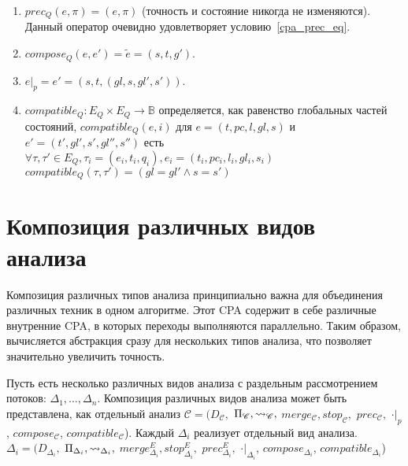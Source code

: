 \begin{enumerate}
\item
$prec_Q(e,\pi)=(e,\pi)$ (точность и состояние никогда не изменяются).
Данный оператор очевидно удовлетворяет условию~\ref{cpa_prec_eq}.

\item 
$compose_Q(e,e')=\tilde{e} = (s, t, g')$.

\item 
$e|_p = e' = (s, t, (gl, s, gl', s'))$.

\item
$compatible_Q: E_Q \times E_Q \to \mathbb{B}$ определяется, как равенство глобальных частей состояний, $compatible_Q(e,i)$ для $e=(t,pc, l, gl,s)$ и $e'=(t',gl',s',gl'',s'')$ есть    
$\forall \tau, \tau' \in E_Q, \tau_i = (e_i, t_i, q_i), e_i=(t_i,pc_i, l_i, gl_i,s_i)$ \\
$compatible_Q(\tau, \tau') = (gl=gl' \land s=s')$

\end{enumerate}

\section{Композиция различных видов анализа}
\label{sect_composite_analysis}

Композиция различных типов анализа принципиально важна для объединения различных техник в одном алгоритме.
Этот CPA содержит в себе различные внутренние CPA, в которых переходы выполняются параллельно.
Таким образом, вычисляется абстракция сразу для нескольких типов анализа, что позволяет значительно увеличить точность.

Пусть есть несколько различных видов анализа с раздельным рассмотрением потоков: $\Delta_1, \dots, \Delta_n$. 
Композиция различных видов анализа может быть представлена, как отдельный анализ $\mathscr{C}=(D_{\mathscr{C}},$ $\Pi_{\mathscr{C}}, \leadsto_{\mathscr{C}},$ $merge_{\mathscr{C}}, stop_{\mathscr{C}},$ $prec_{\mathscr{C}},$ $\cdot|_p$, $compose_{\mathscr{C}}$, $compatible_{\mathscr{C}}$).
Каждый $\Delta_i$ реализует отдельный вид анализа. 
$\Delta_i=(D_{\Delta_i},$ $\Pi_{\Delta_i}, \leadsto_{\Delta_i},$ $merge^E_{\Delta_i}, stop^E_{\Delta_i},$ $prec^E_{\Delta_i},$ $\cdot|_{\Delta_i}$, $compose_{\Delta_i}$, $compatible_{\Delta_i}$)

